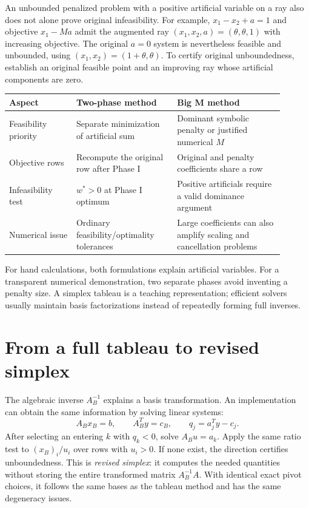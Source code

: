 \documentclass[11pt,a4paper]{article}
\begin{document}
An unbounded penalized problem with a positive artificial variable on a ray
also does not alone prove original infeasibility. For example,
$x_1-x_2+a=1$ and objective $x_1-Ma$ admit the augmented ray
$(x_1,x_2,a)=(\theta,\theta,1)$ with increasing objective. The original
$a=0$ system is nevertheless feasible and unbounded, using
$(x_1,x_2)=(1+\theta,\theta)$.
To certify original unboundedness, establish an original feasible point and
an improving ray whose artificial components are zero.

\begin{center}
  \begin{tabular}{>{\raggedright\arraybackslash}p{0.22\linewidth}>{\raggedright\arraybackslash}p{0.33\linewidth}>{\raggedright\arraybackslash}p{0.35\linewidth}}\toprule
    Aspect & Two-phase method & Big M method\\\midrule
    Feasibility priority & Separate minimization of artificial sum & Dominant symbolic penalty or justified numerical $M$\\
    Objective rows & Recompute the original row after Phase I & Original and penalty coefficients share a row\\
    Infeasibility test & $w^*>0$ at Phase I optimum & Positive artificials require a valid dominance argument\\
    Numerical issue & Ordinary feasibility/optimality tolerances & Large coefficients can also amplify scaling and cancellation problems\\\bottomrule
  \end{tabular}
\end{center}
For hand calculations, both formulations explain artificial variables. For a
transparent numerical demonstration, two separate phases avoid inventing a
penalty size. A simplex tableau is a teaching representation; efficient solvers
usually maintain basis factorizations instead of repeatedly forming full inverses.

\section{From a full tableau to revised simplex}\label{sec:revised}
The algebraic inverse $A_B^{-1}$ explains a basis transformation. An
implementation can obtain the same information by solving linear systems:
\[
  A_Bx_B=b,\qquad A_B^Ty=c_B,\qquad q_j=a_j^Ty-c_j.
\]
After selecting an entering $k$ with $q_k<0$, solve $A_Bu=a_k$.
Apply the same ratio test to $(x_B)_i/u_i$ over rows with $u_i>0$.
If none exist, the direction certifies unboundedness. This is \emph{revised simplex}:
it computes the needed quantities without storing the entire transformed
matrix $A_B^{-1}A$. With identical exact pivot choices, it follows the same
bases as the tableau method and has the same degeneracy issues.
\end{document}
